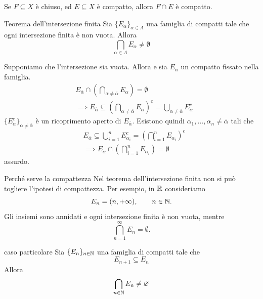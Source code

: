 \documentclass[a4paper]{article}
\begin{document}
Se \(F\subseteq X\) è chiuso, ed \(E\subseteq X\) è compatto, allora \(F \cap E\) è compatto.

\begin{snippettheorem}{Teorema dell'intersezione finita}
    Sia \(\{E_\alpha\}_{\alpha \in A}\) una famiglia di compatti tale che
    ogni intersezione finita è non vuota. Allora
    \[
        \bigcap_{\alpha \in A} E_\alpha \neq \emptyset
    \]
\end{snippettheorem}

\begin{snippetproof}{}
    Supponiamo che l'intersezione sia vuota. Allora
    e sia \(E_{\overline{\alpha}}\) un compatto fissato nella famiglia.
    \begin{align*}
        &E_{\overline{\alpha}} \cap \left(
            \bigcap_{\alpha \neq \overline{\alpha}} E_\alpha
        \right) = \emptyset \\
        &\implies
        E_{\overline{\alpha}} \subseteq
        \left(
            \bigcap_{\alpha \neq \overline{\alpha}} E_\alpha
        \right)^c
        =
        \bigcup_{\alpha \neq \overline{\alpha}} E_\alpha^c
    \end{align*}
    \(\{E_\alpha^c\}_{\alpha \neq \overline{\alpha}}\) è un ricoprimento aperto di \(E_{\overline{\alpha}}\).
    Esistono quindi \(\alpha_1, \ldots, \alpha_n \neq \overline{\alpha}\)
    tali che \begin{align*}
        &E_{\overline{\alpha}} \subseteq \bigcup_{i=1}^n E_{\alpha_i}^c
        = \left(
            \bigcap_{i=1}^n E_{\alpha_i}
        \right)^c \\
        &\implies
        E_{\overline{\alpha}} \cap \left(
            \bigcap_{i=1}^n E_{\alpha_i}
        \right) = \emptyset
    \end{align*}
    assurdo.
\end{snippetproof}

\begin{snippetexample}{Perché serve la compattezza}
    Nel teorema dell'intersezione finita non si può togliere l'ipotesi di compattezza.
    Per esempio, in \(\mathbb{R}\) consideriamo
    \[
        E_n=(n,+\infty), \qquad n\in\mathbb{N}.
    \]
    Gli insiemi sono annidati e ogni intersezione finita è non vuota, mentre
    \[
        \bigcap_{n=1}^{\infty}E_n=\emptyset.
    \]
\end{snippetexample}

\begin{snippetcorollary}{caso particolare}
    Sia \(\{E_n\}_{n\in \mathbb{N}}\) una famiglia di compatti tale che
    \[
        E_{n+1} \subseteq E_n
    \]
    Allora
    \[
        \bigcap_{n\in \mathbb{N}} E_n \neq \varnothing
    \]
\end{snippetcorollary}
\end{document}
